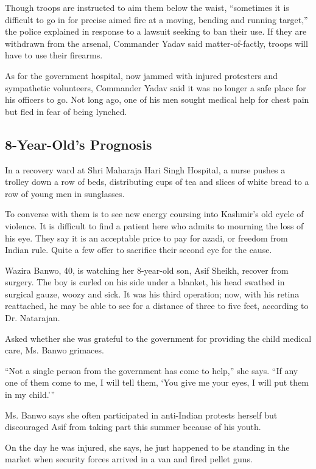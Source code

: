 Though troops are instructed to aim them below the waist, ``sometimes it
is difficult to go in for precise aimed fire at a moving, bending and
running target,'' the police explained in response to a lawsuit seeking
to ban their use. If they are withdrawn from the arsenal, Commander
Yadav said matter-of-factly, troops will have to use their firearms.

As for the government hospital, now jammed with injured protesters and
sympathetic volunteers, Commander Yadav said it was no longer a safe
place for his officers to go. Not long ago, one of his men sought
medical help for chest pain but fled in fear of being lynched.

\hypertarget{8-year-olds-prognosis}{%
\subsection{8-Year-Old's Prognosis}\label{8-year-olds-prognosis}}

In a recovery ward at Shri Maharaja Hari Singh Hospital, a nurse pushes
a trolley down a row of beds, distributing cups of tea and slices of
white bread to a row of young men in sunglasses.

To converse with them is to see new energy coursing into Kashmir's old
cycle of violence. It is difficult to find a patient here who admits to
mourning the loss of his eye. They say it is an acceptable price to pay
for azadi, or freedom from Indian rule. Quite a few offer to sacrifice
their second eye for the cause.

Wazira Banwo, 40, is watching her 8-year-old son, Asif Sheikh, recover
from surgery. The boy is curled on his side under a blanket, his head
swathed in surgical gauze, woozy and sick. It was his third operation;
now, with his retina reattached, he may be able to see for a distance of
three to five feet, according to Dr. Natarajan.

Asked whether she was grateful to the government for providing the child
medical care, Ms. Banwo grimaces.

``Not a single person from the government has come to help,'' she says.
``If any one of them come to me, I will tell them, `You give me your
eyes, I will put them in my child.'''

Ms. Banwo says she often participated in anti-Indian protests herself
but discouraged Asif from taking part this summer because of his youth.

On the day he was injured, she says, he just happened to be standing in
the market when security forces arrived in a van and fired pellet guns.

